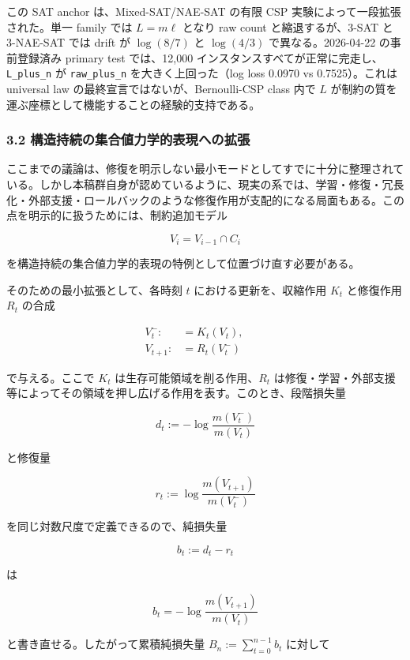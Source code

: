 \documentclass[12pt,a4paper]{article}
\begin{document}
この SAT anchor は、Mixed-SAT/NAE-SAT の有限 CSP 実験によって一段拡張された。単一 family では \(L=m\ell\) となり raw count と縮退するが、3-SAT と 3-NAE-SAT では drift が \(\log(8/7)\) と \(\log(4/3)\) で異なる。2026-04-22 の事前登録済み primary test では、12,000 インスタンスすべてが正常に完走し、\texttt{L\_plus\_n} が \texttt{raw\_plus\_n} を大きく上回った（log loss 0.0970 vs 0.7525）。これは universal law の最終宣言ではないが、Bernoulli-CSP class 内で \(L\) が制約の質を運ぶ座標として機能することの経験的支持である。

\subsubsection{3.2 構造持続の集合値力学的表現への拡張}\label{ux69cbux9020ux6301ux7d9aux306eux96c6ux5408ux5024ux529bux5b66ux7684ux8868ux73feux3078ux306eux62e1ux5f35}

ここまでの議論は、修復を明示しない最小モードとしてすでに十分に整理されている。しかし本稿群自身が認めているように、現実の系では、学習・修復・冗長化・外部支援・ロールバックのような修復作用が支配的になる局面もある。この点を明示的に扱うためには、制約追加モデル

\[
V_{i} = V_{i-1} \cap C_{i}
\]

を構造持続の集合値力学的表現の特例として位置づけ直す必要がある。

そのための最小拡張として、各時刻 \(t\) における更新を、収縮作用 \(K_{t}\) と修復作用 \(R_{t}\) の合成

\[
\begin{aligned}
V_{t}^- :&= K_{t}(V_{t}), \qquad \\
V_{t+1} :&= R_{t}(V_{t}^-)
\end{aligned}
\]

で与える。ここで \(K_{t}\) は生存可能領域を削る作用、\(R_{t}\) は修復・学習・外部支援等によってその領域を押し広げる作用を表す。このとき、段階損失量

\[
d_{t} := - \log \frac{m(V_{t}^-)}{m(V_{t})}
\]

と修復量

\[
r_{t} := \log \frac{m(V_{t+1})}{m(V_{t}^-)}
\]

を同じ対数尺度で定義できるので、純損失量

\[
b_{t} := d_{t} - r_{t}
\]

は

\[
b_{t} = - \log \frac{m(V_{t+1})}{m(V_{t})}
\]

と書き直せる。したがって累積純損失量 \(B_{n} := \sum_{t=0}^{n-1} b_{t}\) に対して
\end{document}
